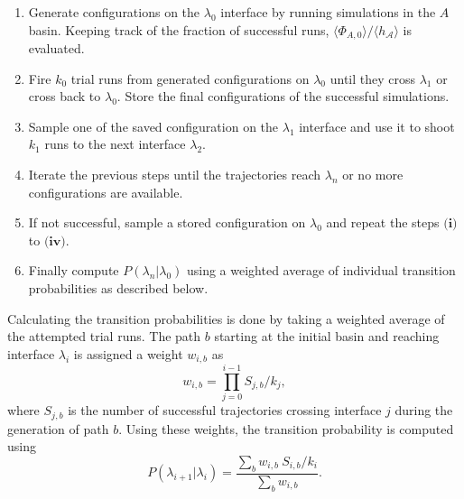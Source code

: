 \begin{enumerate}[label=\textbf{(\roman*)}]
   \item Generate configurations on the $\lambda_0$ interface by running
      simulations in the $A$ basin. Keeping track of the fraction of successful runs,
      $\langle\Phi_{A,0} \rangle/\langle h_{\mathcal{A}}\rangle$ is evaluated.
   \vspace{0.05cm}
   \item Fire $k_0$ trial runs from generated configurations on $\lambda_0$ until they
      cross $\lambda_1$ or cross back to $\lambda_0$. Store the final configurations of
      the successful simulations.
   \vspace{0.05cm}
   \item Sample one of the saved configuration on the $\lambda_1$ interface and use it to
      shoot $k_1$ runs to the next interface $\lambda_2$.
   \vspace{0.05cm}
   \item Iterate the previous steps until the trajectories reach $\lambda_n$ or no more
     configurations are available.
   \vspace{0.05cm}
   \item If not successful, sample a stored configuration on $\lambda_0$ and repeat the
      steps $\textbf{(i)}$ to $\textbf{(iv)}$.
   \vspace{0.05cm}
   \item Finally compute $P(\lambda_n|\lambda_0)$ using a weighted average of individual
     transition probabilities as described below.
\end{enumerate}
\newpage
Calculating the transition probabilities is done by taking a weighted average of the
attempted trial runs. The path $b$ starting at the initial basin and reaching
interface $\lambda_i$ is assigned a weight $w_{i,b}$ as
\begin{equation}
   w_{i,b} = \prod_{j=0}^{i-1} S_{j,b}/k_j,
\end{equation}
where $S_{j,b}$ is the number of successful trajectories crossing interface $j$ during
the generation of path $b$. Using these weights, the transition probability is computed
using
\begin{equation}
   P(\lambda_{i+1} | \lambda_i) = \frac{\sum_{b} w_{i,b}\ S_{i,b}/k_i}{\sum_b w_{i,b}}.
\end{equation}

